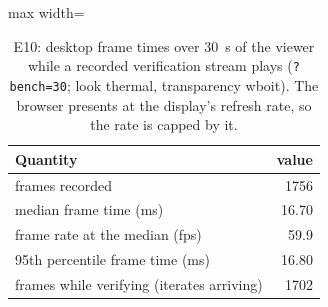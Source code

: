 \begin{table}[t]\centering\small
\begin{adjustbox}{max width=\linewidth}\begin{tabular}{lr}
\hline
Quantity & value \\
\hline
frames recorded & 1756 \\
median frame time (ms) & 16.70 \\
frame rate at the median (fps) & 59.9 \\
95th percentile frame time (ms) & 16.80 \\
frames while verifying (iterates arriving) & 1702 \\
\hline
\end{tabular}\end{adjustbox}
\caption{E10: desktop frame times over 30~s of the viewer while a recorded verification stream plays (\texttt{?bench=30}; look thermal, transparency wboit). The browser presents at the display's refresh rate, so the rate is capped by it.}
\label{tab:e10}
\end{table}
